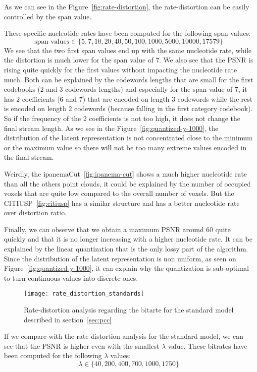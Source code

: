 As we can see in the Figure~\ref{fig:rate-distortion}, the rate-distortion can be easily controlled by the span value. 

These specific nucleotide rates have been computed for the following span values: $$\text{span values} \in \{5, 7, 10, 20, 40, 50, 100, 1000, 5000, 10000, 17579\}$$
We see that the two first span values end up with the same nucleotide rate, while the distortion is much lower for the span value of $7$. We also see that the PSNR is rising quite quickly for the first values without impacting the nucleotide rate much. Both can be explained by the codewords lengths that are small for the first codebooks ($2$ and $3$ codewords lengths) and especially for the span value of $7$, it has $2$ coefficients ($6$ and $7$) that are encoded on length $3$ codewords while the rest is encoded on length $2$ codewords (because falling in the first category codebook). So if the frequency of the $2$ coefficients is not too high, it does not change the final stream length. As we see in the Figure~\ref{fig:quantized-y-1000}, the distribution of the latent representation is not concentrated close to the minimum or the maximum value so there will not be too many extreme values encoded in the final stream.

Weirdly, the ipanemaCut~\ref{fig:ipanema-cut} shows a much higher nucleotide rate than all the others point clouds, it could be explained by the number of occupied voxels that are quite low compared to the overall number of voxels. But the CITIUSP~\ref{fig:citiusp} has a similar structure and has a better nucleotide rate over distortion ratio.

Finally, we can observe that we obtain a maximum PSNR around $60$ quite quickly and that it is no longer increasing with a higher nucleotide rate. It can be explained by the linear quantization that is the only lossy part of the algorithm. Since the distribution of the latent representation is non uniform, as seen on Figure~\ref{fig:quantized-y-1000}, it can explain why the quantization is sub-optimal to turn continuous values into discrete ones.

\begin{figure}[ht]
    \centering
    \texttt{[image: rate\_distortion\_standards]}
    \caption{Rate-distortion analysis regarding the bitarte for the standard model described in section~\ref{sec:pcc}}
    \label{fig:rate-distortion-standards}
\end{figure}

If we compare with the rate-distortion analysis for the standard model, we can see that the PSNR is higher even with the smallest $\lambda$ value. These bitrates have been computed for the following $\lambda$ values:
$$
\lambda \in \{40,200,400,700,1000,1750\}
$$

